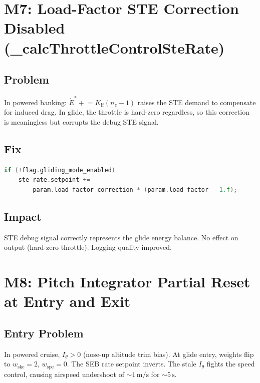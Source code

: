 \documentclass[12pt,a4paper]{article}
\begin{document}
\section{M7: Load-Factor STE Correction Disabled (\_calcThrottleControlSteRate)}

\subsection{Problem}

In powered banking:
$\dot{E}^* \mathrel{+}= K_{\text{lf}}(n_z - 1)$
raises the STE demand to compensate for induced drag. In glide, the
throttle is hard-zero regardless, so this correction is meaningless but
corrupts the debug STE signal.

\subsection{Fix}

\begin{lstlisting}[language=C++]
if (!flag.gliding_mode_enabled)
    ste_rate.setpoint +=
        param.load_factor_correction * (param.load_factor - 1.f);
\end{lstlisting}

\subsection{Impact}

STE debug signal correctly represents the glide energy balance. No effect
on output (hard-zero throttle). Logging quality improved.

\section{M8: Pitch Integrator Partial Reset at Entry and Exit}

\subsection{Entry Problem}

In powered cruise, $I_\theta > 0$ (nose-up altitude trim bias).
At glide entry, weights flip to $w_{\text{ske}} = 2$, $w_{\text{spe}} = 0$.
The SEB rate setpoint inverts. The stale $I_\theta$ fights the speed
control, causing airspeed undershoot of $\sim 1\,\text{m/s}$ for $\sim 5\,\text{s}$.
\end{document}
